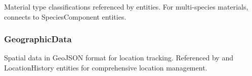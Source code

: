 Material type classifications referenced by \TRU{} entities. For multi-species materials, connects to SpeciesComponent entities.



\subsubsection{GeographicData}
\label{sec:entity-geographic-data}

Spatial data in GeoJSON format for location tracking. Referenced by \TRU{} and LocationHistory entities for comprehensive location management.

